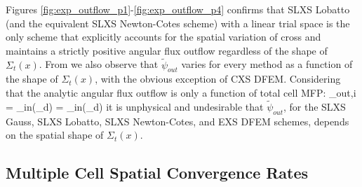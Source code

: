 Figures \ref{fig:exp_outflow_p1}-\ref{fig:exp_outflow_p4} confirms that  SLXS Lobatto (and the equivalent SLXS Newton-Cotes scheme) with a linear trial space is the only scheme that explicitly accounts for the spatial variation of cross and maintains a strictly positive angular flux outflow regardless of the shape of $\Sigma_t(x)$.
From  we also observe that $\widetilde{\psi}_{out}$ varies for every method as a function of the shape of $\Sigma_t(x)$, with the obvious exception of CXS DFEM.
Considering that the analytic angular flux outflow is only a function of total cell MFP:
\benum
\label{eq:chap3_outflow_truth}
\psi_{out,i} = \psi_{in}(\mu_d) \exp{} = \psi_{in}(\mu_d) \exp{} \pec
\eenum
it is unphysical and undesirable that $\widetilde{\psi}_{out}$, for the SLXS Gauss, SLXS Lobatto, SLXS Newton-Cotes, and EXS DFEM schemes, depends on the spatial shape of $\Sigma_t(x)$.
\clearpage
\subsection{Multiple Cell Spatial Convergence Rates}

